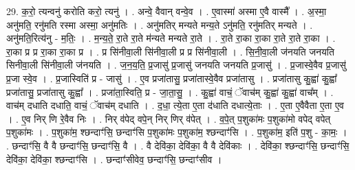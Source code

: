 \documentclass[17pt]{extarticle}
\begin{document}
29. क॒रो॒ त्यन्वनु॑ करोति करो॒ त्यनु॑ । . अन्वे॒ वैवान् वन्वे॒व । . ए॒वास्मा॑ अस्मा ए॒वै वास्मै᳚ । . अ॒स्मा॒ अनु॑मति॒ रनु॑मति रस्मा अस्मा॒ अनु॑मतिः । . अनु॑मतिर् मन्यते मन्य॒ते ऽनु॑मति॒ रनु॑मतिर् मन्यते । . अनु॑मति॒रित्य॑नु - म॒तिः॒ । . म॒न्य॒ते॒ रा॒ते रा॒ते म॑न्यते मन्यते रा॒ते । . रा॒ते रा॒का रा॒का रा॒ते रा॒ते रा॒का । . रा॒का प्र प्र रा॒का रा॒का प्र । . प्र सि॑नीवा॒ली सि॑नीवा॒ली प्र प्र सि॑नीवा॒ली । . सि॒नी॒वा॒ली ज॑नयति जनयति सिनीवा॒ली सि॑नीवा॒ली ज॑नयति । . ज॒न॒य॒ति॒ प्र॒जासु॑ प्र॒जासु॑ जनयति जनयति प्र॒जासु॑ । . प्र॒जास्वे॒वैव प्र॒जासु॑ प्र॒जा स्वे॒व । . प्र॒जास्विति॑ प्र - जासु॑ । . ए॒व प्रजा॑तासु॒ प्रजा॑तास्वे॒वैव प्रजा॑तासु । . प्रजा॑तासु कु॒ह्वा॑ कु॒ह्वा᳚ प्रजा॑तासु॒ प्रजा॑तासु कु॒ह्वा᳚ । . प्रजा॑ता॒स्विति॒ प्र - जा॒ता॒सु॒ । . कु॒ह्वा॑ वाचं॒ ॅवाच॑म् कु॒ह्वा॑ कु॒ह्वा॑ वाच᳚म् । . वाच॑म् दधाति दधाति॒ वाचं॒ ॅवाच॑म् दधाति । . द॒धा॒ त्ये॒ता ए॒ता द॑धाति दधात्ये॒ताः । . ए॒ता ए॒वैवैता ए॒ता ए॒व । . ए॒व निर् णि रे॒वैव निः । . निर् व॑पेद् वपे॒न् निर् णिर् व॑पेत् । . व॒पे॒त् प॒शुका॑मः प॒शुका॑मो वपेद् वपेत् प॒शुका॑मः । . प॒शुका॑म॒ श्छन्दाꣳ॑सि॒ छन्दाꣳ॑सि प॒शुका॑मः प॒शुका॑म॒ श्छन्दाꣳ॑सि । . प॒शुका॑म॒ इति॑ प॒शु - का॒मः॒ । . छन्दाꣳ॑सि॒ वै वै छन्दाꣳ॑सि॒ छन्दाꣳ॑सि॒ वै । . वै देवि॑का॒ देवि॑का॒ वै वै देवि॑काः । . देवि॑का॒ श्छन्दाꣳ॑सि॒ छन्दाꣳ॑सि॒ देवि॑का॒ देवि॑का॒ श्छन्दाꣳ॑सि । . छन्दाꣳ॑सीवेव॒ छन्दाꣳ॑सि॒ छन्दाꣳ॑सीव । \newline
\end{document}
